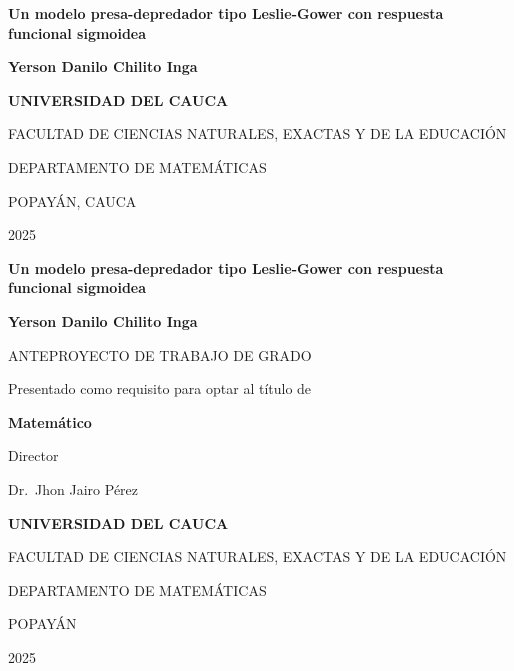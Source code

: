 \documentclass[12pt,letterpaper,oneside]{book}
\theoremstyle{definition}
\theoremstyle{remark}
\newcommand{\tituloTrabajo}{Un modelo presa-depredador tipo Leslie-Gower con respuesta funcional sigmoidea}
\newcommand{\nombreAutor}{Yerson Danilo Chilito Inga}
\newcommand{\nombreDirector}{Jhon Jairo Pérez}
\newcommand{\tituloDirector}{Dr.} %
\newcommand{\tituloOptar}{Matemático}
\newcommand{\anioTrabajo}{2025}
\newcommand{\ciudadTrabajo}{POPAYÁN}
\begin{document}
	\frontmatter
	\begin{center}
		\centering
		\vspace*{1cm}
		
		{\Large \textbf{\tituloTrabajo}\par}
		
		\vspace{6cm}
		
		{\large \textbf{\nombreAutor}\par}
		
		\vfill
		
		{\large \textbf{UNIVERSIDAD DEL CAUCA}\par}
		{\large FACULTAD DE CIENCIAS NATURALES, EXACTAS Y DE LA EDUCACIÓN\par}
		{\large DEPARTAMENTO DE MATEMÁTICAS\par}
		{\large \ciudadTrabajo, CAUCA\par}
		{\large \anioTrabajo\par}
	\end{center}
	
	\newpage
	\thispagestyle{empty}
	\begin{center}
		\vspace*{1cm}
		{\Large \textbf{\tituloTrabajo}\par}
		
		\vspace{3cm}
		
		{\large \textbf{\nombreAutor}\par}
		
		\vfill
		
		{\large ANTEPROYECTO DE TRABAJO DE GRADO\par}
		\vspace{0.5cm}
		{\normalsize Presentado como requisito para optar al título de\par}
		{\large \textbf{\tituloOptar}\par}
		
		\vspace{2cm}
		
		{\large Director\par}
		{\large \tituloDirector\ \nombreDirector\par}
		
		\vfill
		
		{\large \textbf{UNIVERSIDAD DEL CAUCA}\par}
		{\large FACULTAD DE CIENCIAS NATURALES, EXACTAS Y DE LA EDUCACIÓN\par}
		{\large DEPARTAMENTO DE MATEMÁTICAS\par}
		{\large \ciudadTrabajo\par}
		{\large \anioTrabajo\par}
	\end{center}
	\tableofcontents
	
\end{document}
